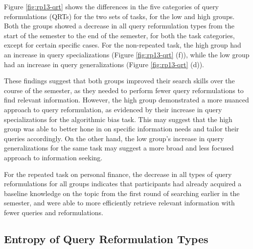 \documentclass[letterpaper, nobind]{templates/ociamthesis}
\begin{document}
Figure \ref{fig:rp13-qrt} shows the differences in the five categories of query reformulations (QRTs) for the two sets of tasks, for the low and high groups.
Both the groups showed a decrease in all query reformulation types from the start of the semester to the end of the semester, for both the task categories, except for certain specific cases.
For the non-repeated task, the high group had an increase in query specializations (Figure \ref{fig:rp13-qrt} (f)), while the low group had an increase in query generalizations (Figure \ref{fig:rp13-qrt} (d)).

These findings suggest that both groups improved their search skills over the course of the semester, as they needed to perform fewer query reformulations to find relevant information. However, the high group demonstrated a more nuanced approach to query reformulation, as evidenced by their increase in query specializations for the algorithmic bias task. This may suggest that the high group was able to better hone in on specific information needs and tailor their queries accordingly. On the other hand, the low group's increase in query generalizations for the same task may suggest a more broad and less focused approach to information seeking.

For the repeated task on personal finance, the decrease in all types of query reformulations for all groups indicates that participants had already acquired a baseline knowledge on the topic from the first round of searching earlier in the semester, and were able to more efficiently retrieve relevant information with fewer queries and reformulations.

\hypertarget{sec-res-phase13-query-H}{%
\subsection{Entropy of Query Reformulation Types}\label{sec-res-phase13-query-H}}
\end{document}
